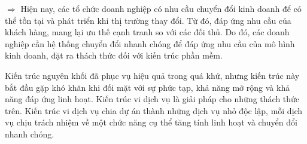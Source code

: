 






$\Rightarrow$ Hiện nay, các tổ chức doanh nghiệp có nhu cầu chuyển đổi kinh doanh để có thể tồn tại và phát triển khi thị trường thay đổi. Từ đó, đáp ứng nhu cầu của khách hàng, mang lại ưu thế cạnh tranh so với các đối thủ. Do đó, các doanh nghiệp cần hệ thống chuyển đổi nhanh chóng để đáp ứng nhu cầu của mô hình kinh doanh, đặt ra thách thức đối với kiến trúc phần mềm.



Kiến trúc nguyên khối đã phục vụ hiệu quả trong quá khứ, nhưng kiến trúc này bắt đầu gặp khó khăn khi đối mặt với sự phức tạp, khả năng mở rộng và khả năng đáp ứng linh hoạt. Kiến trúc vi dịch vụ là giải pháp cho những thách thức trên. Kiến trúc vi dịch vụ chia dự án thành những dịch vụ nhỏ độc lập, mỗi dịch vụ chịu trách nhiệm về một chức năng cụ thể tăng tính linh hoạt và chuyển đổi nhanh chóng.
